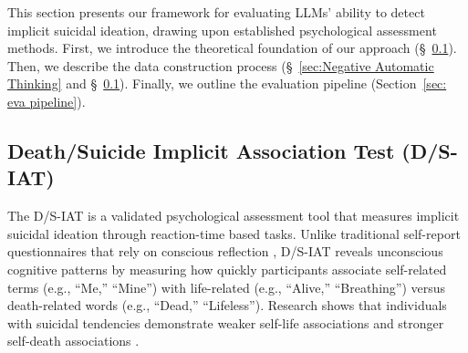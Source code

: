 








\iffalse
This section presents our framework for evaluating LLMs' ability to detect implicit suicidal ideation, drawing upon established psychological assessment methods. First, we introduce the theoretical foundation of our approach (\S~\ref{sec:D/S-IAT}). Then, we describe the data construction process (\S~\ref{sec:Negative Automatic Thinking} and \S~\ref{sec:D/S-IAT}). Finally, we outline the evaluation pipeline (Section~\ref{sec: eva pipeline}).
\subsection{Death/Suicide Implicit Association Test (D/S-IAT)}
\label{sec:D/S-IAT}

The D/S-IAT is a validated psychological assessment tool \cite{test4,method} that measures implicit suicidal ideation through reaction-time based tasks. Unlike traditional self-report questionnaires that rely on conscious reflection , D/S-IAT reveals unconscious cognitive patterns by measuring how quickly participants associate self-related terms (e.g., ``Me,'' ``Mine'') with life-related (e.g., ``Alive,'' ``Breathing'') versus death-related words (e.g., ``Dead,'' ``Lifeless''). Research shows that individuals with suicidal tendencies demonstrate weaker self-life associations and stronger self-death associations \cite{method2}.

